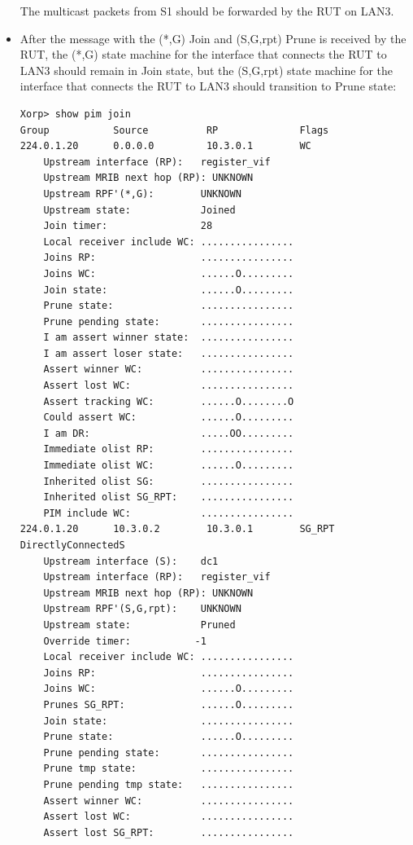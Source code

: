 \documentclass[11pt]{report}
\begin{document}
\begin{itemize}
  The multicast packets from S1 should be forwarded by the RUT on LAN3.

  \item After the message with the (*,G) Join and (S,G,rpt) Prune is received
  by the RUT, the (*,G) state machine for the interface that connects the RUT
  to LAN3 should remain in Join state, but
  the (S,G,rpt) state machine for the interface that connects the RUT to
  LAN3 should transition to Prune state:

\begin{verbatim}
Xorp> show pim join 
Group           Source          RP              Flags
224.0.1.20      0.0.0.0         10.3.0.1        WC   
    Upstream interface (RP):   register_vif
    Upstream MRIB next hop (RP): UNKNOWN
    Upstream RPF'(*,G):        UNKNOWN
    Upstream state:            Joined 
    Join timer:                28
    Local receiver include WC: ................
    Joins RP:                  ................
    Joins WC:                  ......O.........
    Join state:                ......O.........
    Prune state:               ................
    Prune pending state:       ................
    I am assert winner state:  ................
    I am assert loser state:   ................
    Assert winner WC:          ................
    Assert lost WC:            ................
    Assert tracking WC:        ......O........O
    Could assert WC:           ......O.........
    I am DR:                   .....OO.........
    Immediate olist RP:        ................
    Immediate olist WC:        ......O.........
    Inherited olist SG:        ................
    Inherited olist SG_RPT:    ................
    PIM include WC:            ................
224.0.1.20      10.3.0.2        10.3.0.1        SG_RPT DirectlyConnectedS 
    Upstream interface (S):    dc1
    Upstream interface (RP):   register_vif
    Upstream MRIB next hop (RP): UNKNOWN
    Upstream RPF'(S,G,rpt):    UNKNOWN
    Upstream state:            Pruned 
    Override timer:           -1
    Local receiver include WC: ................
    Joins RP:                  ................
    Joins WC:                  ......O.........
    Prunes SG_RPT:             ......O.........
    Join state:                ................
    Prune state:               ......O.........
    Prune pending state:       ................
    Prune tmp state:           ................
    Prune pending tmp state:   ................
    Assert winner WC:          ................
    Assert lost WC:            ................
    Assert lost SG_RPT:        ................

\end{verbatim}
\end{itemize}
\end{document}
